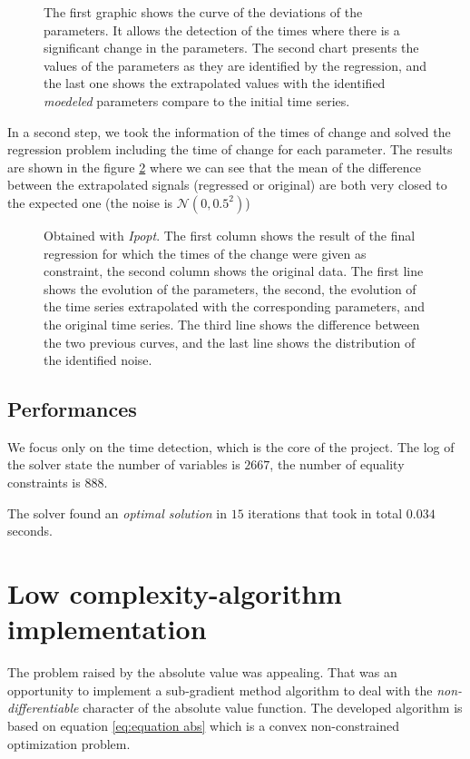 \documentclass[11pt]{article}
\begin{document}
    \begin{figure}[h]
        \centering
        
        \caption{\label{fig:ipopt_time_detection} The first graphic shows the curve of the deviations of the parameters. It allows the detection of the times where there is a significant change in the parameters. The second chart presents the values of the parameters as they are identified by the regression, and the last one shows the extrapolated values with the identified \emph{moedeled} parameters compare to the initial time series.}
    \end{figure}

    In a second step, we took the information of the times of change and solved the regression problem including the time of change for each parameter. The results are shown in the figure \ref{fig:final regression} where we can see that the mean of the difference between the extrapolated signals (regressed or original) are both very closed to the expected one (the noise is $\mathcal{N}(0, 0.5^2)$)

    \begin{figure}[h]
        \centering
        
        \caption{\label{fig:final regression} Obtained with \emph{Ipopt}. The first column shows the result of the final regression for which the times of the change were given as constraint, the second column shows the original data. The first line shows the evolution of the parameters, the second, the evolution of the time series extrapolated with the corresponding parameters, and the original time series. The third line shows the difference between the two previous curves, and the last line shows the distribution of the identified noise.}
    \end{figure}

    \subsection{Performances}
        We focus only on the time detection, which is the core of the project. The log of the solver state the number of variables is $2667$, the number of equality constraints is $888$.

        The solver found an \emph{optimal solution} in $15$ iterations that took in total $0.034$ seconds.

    \FloatBarrier

\section{Low complexity-algorithm implementation}
    The problem raised by the absolute value was appealing. That was an opportunity to implement a sub-gradient method algorithm to deal with the \emph{non-differentiable} character of the absolute value function. The developed algorithm is based on equation \ref{eq:equation abs} which is a convex non-constrained optimization problem.
    
\end{document}
